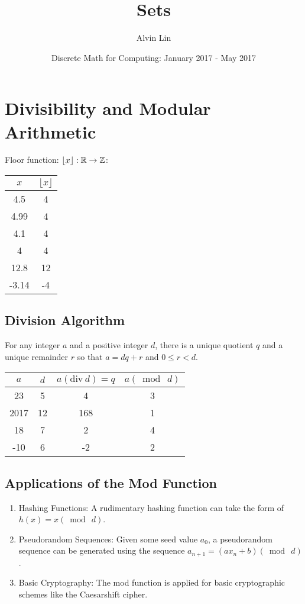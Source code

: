 \documentclass{math}
\title{Sets}
\author{Alvin Lin}
\date{Discrete Math for Computing: January 2017 - May 2017}
\begin{document}
\maketitle

\section*{Divisibility and Modular Arithmetic}
Floor function: \( \lfloor x\rfloor:\mathbb{R}\to\mathbb{Z} \):
\begin{center}
  \begin{tabular}{|c|c|}
    \hline
    \( x \) & \( \lfloor x\rfloor \) \\
    \hline
    4.5 & 4 \\
    \hline
    4.99 & 4 \\
    \hline
    4.1 & 4 \\
    \hline
    4 & 4 \\
    \hline
    12.8 & 12 \\
    \hline
    -3.14 & -4 \\
    \hline
  \end{tabular}
\end{center}

\subsection*{Division Algorithm}
For any integer \( a \) and a positive integer \( d \), there is a unique
quotient \( q \) and a unique remainder \( r \) so that \( a = dq+r \) and
\( 0\leq r<d \).
\begin{center}
  \begin{tabular}{|c|c|c|c|}
    \hline
    \( a \) & \( d \) & \( a(\mathrm{div}\ d) = q \) & \( a(\bmod\ d) \) \\
    \hline
    23 & 5 & 4 & 3 \\
    \hline
    2017 & 12 & 168 & 1 \\
    \hline
    18 & 7 & 2 & 4 \\
    \hline
    -10 & 6 & -2 & 2 \\
    \hline
  \end{tabular}
\end{center}

\subsection*{Applications of the Mod Function}
\begin{enumerate}
  \item Hashing Functions: A rudimentary hashing function can take the form of
    \( h(x) = x(\bmod\ d) \).
  \item Pseudorandom Sequences: Given some seed value \( a_{0} \), a
    pseudorandom sequence can be generated using the sequence
    \( a_{n+1} = (ax_{n}+b) (\bmod\ d) \).
  \item Basic Cryptography: The mod function is applied for basic cryptographic
    schemes like the Caesarshift cipher.
\end{enumerate}
\end{document}
